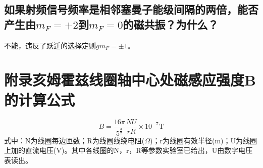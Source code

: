 \documentclass[a4paper]{article}
\begin{document}
\subsection{如果射频信号频率是相邻塞曼子能级间隔的两倍，能否产生由$m_F = +2$到$m_F = 0$的磁共振？为什么？}
不能，违反了跃迁的选择定则$gm_F=\pm 1$。

\section*{附录\quad 亥姆霍兹线圈轴中心处磁感应强度B的计算公式}
\begin{equation}
B = \frac{16\pi}{5^{\frac{3}{2}}}\frac{NU}{rR}\times 10^{-7}\text{T}\label{eq9}
\end{equation}
式中：N为线圈每边匝数；R为线圈线绕电阻($\Omega$)；r为线圈有效半径(m)；U为线圈上加的直流电压(V)。其中各线圈的N，r，R等参数实验室已给出，U由数字电压表读出。

\nocite{jiaocai}

\end{document}

